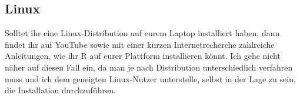 \documentclass[
  letterpaper,
  DIV=11,
  numbers=noendperiod]{scrartcl}
\begin{document}
\hypertarget{linux}{%
\subsection{Linux}\label{linux}}

Solltet ihr eine Linux-Distribution auf eurem Laptop installiert haben,
dann findet ihr auf YouTube sowie mit einer kurzen Internetrecherche
zahlreiche Anleitungen, wie ihr R auf eurer Plattform installieren
könnt. Ich gehe nicht näher auf diesen Fall ein, da man je nach
Distribution unterschiedlich verfahren muss und ich dem geneigten
Linux-Nutzer unterstelle, selbst in der Lage zu sein, die Installation
durchzuführen.
\end{document}
